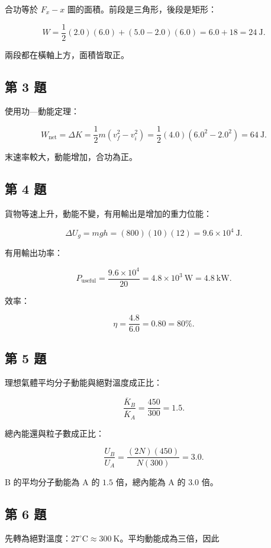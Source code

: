 \documentclass[11pt,a4paper]{article}
\begin{document}
合功等於 \(F_x-x\) 圖的面積。前段是三角形，後段是矩形：

\[
W=\frac12(2.0)(6.0)+(5.0-2.0)(6.0)
=6.0+18=24\ \mathrm J.
\]

兩段都在橫軸上方，面積皆取正。

\subsection{第 3 題}\label{ux7b2c-3-ux984c}

使用功---動能定理：

\[
W_{\mathrm{net}}=\Delta K
=\frac12m(v_f^2-v_i^2)
=\frac12(4.0)(6.0^2-2.0^2)
=64\ \mathrm J.
\]

末速率較大，動能增加，合功為正。

\subsection{第 4 題}\label{ux7b2c-4-ux984c}

貨物等速上升，動能不變，有用輸出是增加的重力位能：

\[
\Delta U_g=mgh=(800)(10)(12)=9.6\times10^4\ \mathrm J.
\]

有用輸出功率：

\[
P_{\mathrm{useful}}=\frac{9.6\times10^4}{20}
=4.8\times10^3\ \mathrm W=4.8\ \mathrm{kW}.
\]

效率：

\[
\eta=\frac{4.8}{6.0}=0.80=80\%.
\]

\subsection{第 5 題}\label{ux7b2c-5-ux984c}

理想氣體平均分子動能與絕對溫度成正比：

\[
\frac{\overline K_B}{\overline K_A}
=\frac{450}{300}=1.5.
\]

總內能還與粒子數成正比：

\[
\frac{U_B}{U_A}
=\frac{(2N)(450)}{N(300)}=3.0.
\]

B 的平均分子動能為 A 的 \(1.5\) 倍，總內能為 A 的 \(3.0\) 倍。

\subsection{第 6 題}\label{ux7b2c-6-ux984c}

先轉為絕對溫度：\(27^\circ\mathrm C\approx300\ \mathrm K\)。平均動能成為三倍，因此
\end{document}
